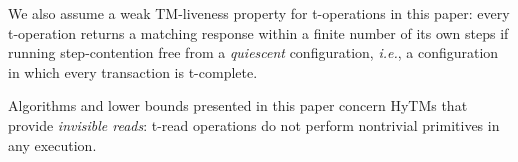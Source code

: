 We also assume a weak TM-liveness property for t-operations in this paper: every t-operation returns a matching
response within a finite number of its own steps if running step-contention free from a \emph{quiescent} configuration,
\emph{i.e.}, a configuration in which every transaction is t-complete.

Algorithms and lower bounds presented in this paper concern HyTMs that provide \emph{invisible reads}: t-read operations do not perform
nontrivial primitives in any execution.
%
%
% 	 
%
